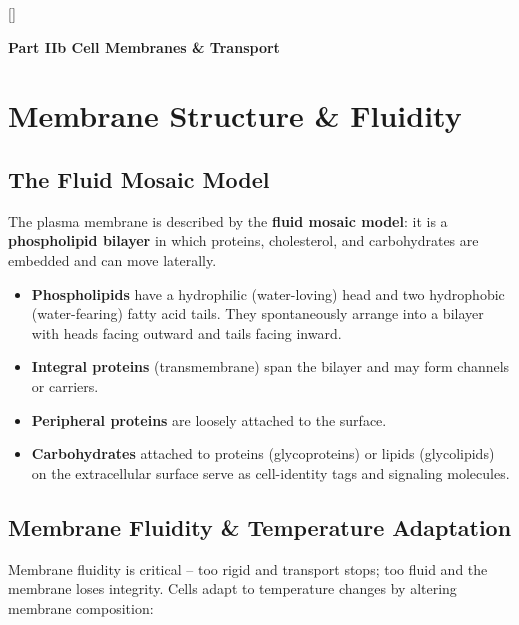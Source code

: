 \documentclass[11pt, letterpaper]{article}
\newcommand{\tealsections}{%
  \titleformat{\section}{\large\bfseries\color{sectionteal}}{}{0em}{}[\color{sectionteal}\titlerule]%
  \titleformat{\subsection}{\normalsize\bfseries\color{sectionteal!80!black}}{}{0em}{}%
}
\newcommand{\partbanner}[3]{%
  \begin{tcolorbox}[colback=#1, colframe=#2, boxrule=1.2pt, arc=4pt,
    left=8pt, right=8pt, top=6pt, bottom=6pt]
    \begin{center}{\LARGE\bfseries #3}\end{center}
  \end{tcolorbox}%
}
\begin{document}
\newpage

\tealsections
{}
\partbanner{part5bg}{sectionteal}{Part IIb \quad Cell Membranes \& Transport}

\vspace{8pt}

\section*{Membrane Structure \& Fluidity}

\subsection*{The Fluid Mosaic Model}
The plasma membrane is described by the \textbf{fluid mosaic model}: it is a \textbf{phospholipid bilayer} in which proteins, cholesterol, and carbohydrates are embedded and can move laterally.

\begin{itemize}[noitemsep]
  \item \textbf{Phospholipids} have a hydrophilic (water-loving) head and two hydrophobic (water-fearing) fatty acid tails. They spontaneously arrange into a bilayer with heads facing outward and tails facing inward.
  \item \textbf{Integral proteins} (transmembrane) span the bilayer and may form channels or carriers.
  \item \textbf{Peripheral proteins} are loosely attached to the surface.
  \item \textbf{Carbohydrates} attached to proteins (glycoproteins) or lipids (glycolipids) on the extracellular surface serve as cell-identity tags and signaling molecules.
\end{itemize}

\subsection*{Membrane Fluidity \& Temperature Adaptation}
Membrane fluidity is critical -- too rigid and transport stops; too fluid and the membrane loses integrity. Cells adapt to temperature changes by altering membrane composition:
\end{document}

